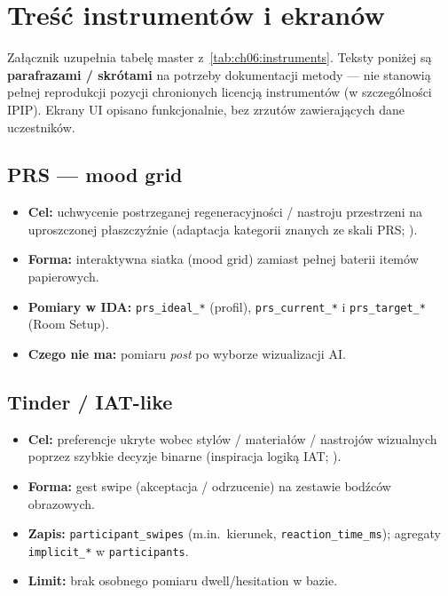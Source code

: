 \chapter{Treść instrumentów i ekranów}
\label{app:b:top}

Załącznik uzupełnia tabelę master z~\cref{tab:ch06:instruments}. Teksty poniżej są \textbf{parafrazami / skrótami} na potrzeby dokumentacji metody --- nie stanowią pełnej reprodukcji pozycji chronionych licencją instrumentów (w szczególności IPIP). Ekrany UI opisano funkcjonalnie, bez zrzutów zawierających dane uczestników.

\section{PRS --- mood grid}
\label{app:b:sec:prs}

\begin{itemize}
  \item \textbf{Cel:} uchwycenie postrzeganej regeneracyjności / nastroju przestrzeni na uproszczonej płaszczyźnie (adaptacja kategorii znanych ze skali PRS; \cite{hartig1997prs}).
  \item \textbf{Forma:} interaktywna siatka (mood grid) zamiast pełnej baterii itemów papierowych.
  \item \textbf{Pomiary w IDA:} \texttt{prs\_ideal\_*} (profil), \texttt{prs\_current\_*} i \texttt{prs\_target\_*} (Room Setup).
  \item \textbf{Czego nie ma:} pomiaru \emph{post} po wyborze wizualizacji AI.
\end{itemize}

\section{Tinder / IAT-like}
\label{app:b:sec:tinder}

\begin{itemize}
  \item \textbf{Cel:} preferencje ukryte wobec stylów / materiałów / nastrojów wizualnych poprzez szybkie decyzje binarne (inspiracja logiką IAT; \cite{greenwald1998iat}).
  \item \textbf{Forma:} gest swipe (akceptacja / odrzucenie) na zestawie bodźców obrazowych.
  \item \textbf{Zapis:} \texttt{participant\_swipes} (m.in.\ kierunek, \texttt{reaction\_time\_ms}); agregaty \texttt{implicit\_*} w \texttt{participants}.
  \item \textbf{Limit:} brak osobnego pomiaru dwell/hesitation w bazie.
\end{itemize}

